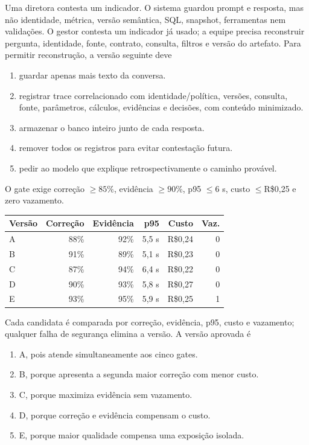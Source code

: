 \TextoBase
Uma diretora contesta um indicador. O sistema guardou prompt e resposta, mas não identidade, métrica, versão semântica, SQL, snapshot, ferramentas nem validações.
O gestor contesta um indicador já usado; a equipe precisa reconstruir pergunta, identidade, fonte, contrato, consulta, filtros e versão do artefato.
\FonteDidatica
\Comando Para permitir reconstrução, a versão seguinte deve
\begin{enumerate}[label=\Alph*)]
\item guardar apenas mais texto da conversa.
\item registrar trace correlacionado com identidade/política, versões, consulta, fonte, parâmetros, cálculos, evidências e decisões, com conteúdo minimizado.
\item armazenar o banco inteiro junto de cada resposta.
\item remover todos os registros para evitar contestação futura.
\item pedir ao modelo que explique retrospectivamente o caminho provável.
\end{enumerate}

\TextoBase
O gate exige correção $\geq85\%$, evidência $\geq90\%$, p95 $\leq6$ s, custo $\leq$R\$0,25 e zero vazamento.
\begin{center}\small
\begin{tabularx}{\textwidth}{@{}Yrrrrr@{}}\toprule
\textbf{Versão} & \textbf{Correção} & \textbf{Evidência} & \textbf{p95} & \textbf{Custo} & \textbf{Vaz.}\\\midrule
A & 88\% & 92\% & 5,5 s & R\$0,24 & 0\\
B & 91\% & 89\% & 5,1 s & R\$0,23 & 0\\
C & 87\% & 94\% & 6,4 s & R\$0,22 & 0\\
D & 90\% & 93\% & 5,8 s & R\$0,27 & 0\\
E & 93\% & 95\% & 5,9 s & R\$0,25 & 1\\\bottomrule
\end{tabularx}\end{center}
\FonteDidatica
Cada candidata é comparada por correção, evidência, p95, custo e vazamento; qualquer falha de segurança elimina a versão.
\Comando A versão aprovada é
\begin{enumerate}[label=\Alph*)]
\item A, pois atende simultaneamente aos cinco gates.
\item B, porque apresenta a segunda maior correção com menor custo.
\item C, porque maximiza evidência sem vazamento.
\item D, porque correção e evidência compensam o custo.
\item E, porque maior qualidade compensa uma exposição isolada.
\end{enumerate}

